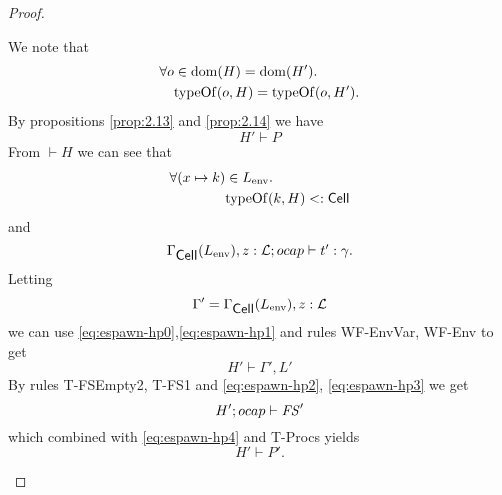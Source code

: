 \begin{proof}
\begin{description}
      We note that
      \begin{equation} \label{eq:espawn-hp0}
        \begin{aligned}
          \forall o &\in \mbox{$\mathrm{dom}$}(H) = \mbox{$\mathrm{dom}$}(H'). \\
            &\mbox{$\mathrm{typeOf}$}(o, H) = \mbox{$\mathrm{typeOf}$}(o, H').
        \end{aligned}
      \end{equation}
      By propositions \ref{prop:2.13} and \ref{prop:2.14} we have
      \begin{equation} \label{eq:espawn-hp4}
        H' \vdash P
      \end{equation}
      From $\vdash H$ we can see that
      \begin{equation} \label{eq:espawn-hp1}
        \begin{aligned}
          \forall (x \mapsto k) &\in L_{\text{env}}. \\
            &\mbox{$\mathrm{typeOf}$}(k, H) <: \mbox{$\mathsf{Cell}$}
        \end{aligned}
      \end{equation}
      and
      \begin{equation} \label{eq:espawn-hp2}
        \mbox{$\Gamma_{\mbox{$\mathsf{Cell}$}}(L_{\text{env}}), z:
        \mbox{$\mathcal{L}$};\mbox{$ocap$}\vdash t':\gamma$}.
      \end{equation}
      Letting
      \begin{equation}
        \Gamma' = \Gamma_{\mbox{$\mathsf{Cell}$}}(L_{\text{env}}), z: \mbox{$\mathcal{L}$}
      \end{equation}
      we can use \eqref{eq:espawn-hp0},\eqref{eq:espawn-hp1} and rules {\sc
      WF-EnvVar, WF-Env} to get
      \begin{equation} \label{eq:espawn-hp3}
        H' \vdash \Gamma', L'
      \end{equation}
      By rules {\sc T-FSEmpty2, T-FS1} and \eqref{eq:espawn-hp2},
      \eqref{eq:espawn-hp3} we get
      \begin{equation}
        H'; \mbox{$ocap$} \vdash \mathit{FS}'
      \end{equation}
      which combined with \eqref{eq:espawn-hp4} and {\sc T-Procs} yields
      \begin{equation}
        H' \vdash P'.
      \end{equation}
      

\end{description}
\end{proof}
